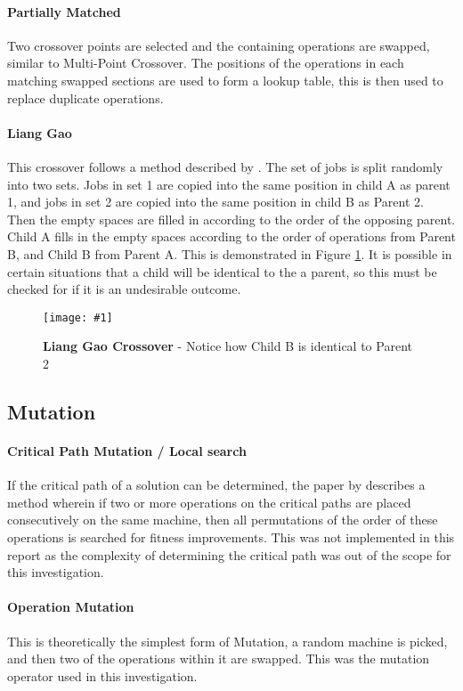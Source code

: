 \documentclass[14pt]{acmsiggraph}
\newcommand{\figuremacroW}[4]{
	\begin{figure}[h] %
		\centering
		\texttt{[image: \#1]}
		\caption[#2]{\textbf{#2} - #3}
		\label{fig:#1}
	\end{figure}
}
\begin{document}
	\paragraph{Partially Matched }
	Two crossover points are selected and the containing operations are swapped, similar to Multi-Point Crossover. The positions of the operations in each matching swapped sections are used to form a lookup table, this is then used to replace duplicate operations.  \cite{sivanandam2007introduction}
	
	\paragraph{Liang Gao}
	This crossover follows a method described by \cite{gao2011efficient}. The set of jobs is split randomly into two sets. Jobs in set 1 are copied into the same position in child A as parent 1, and jobs in set 2 are copied into the same position in child B as Parent 2. Then the empty spaces are filled in according to the order of the opposing parent. Child A fills in the empty spaces according to the order of operations from Parent B, and Child B from Parent A. This is demonstrated in Figure \ref{fig:cx}. It is possible in certain situations that a child will be identical to the a parent, so this must be checked for if it is an undesirable outcome.
	
	\figuremacroW
	{cx}
	{Liang Gao Crossover}
	{Notice how Child B is identical to Parent 2}
	{1.0}
	
	\subsection{Mutation}\label{mutmethods}
	\paragraph {Critical Path Mutation / Local search}
	If the critical path of a solution can be determined, the paper by \cite{gao2011efficient} describes a method wherein if two or more operations on the critical paths are placed consecutively on the same machine, then all permutations of the order of these operations is searched for fitness improvements. This was not implemented in this report as the complexity of determining the critical path was out of the scope for this investigation.
	
	\paragraph{Operation Mutation}
	This is theoretically the simplest form of Mutation, a random machine is picked, and then two of the operations within it are swapped. This was the mutation operator used in this investigation.
	
\end{document}
